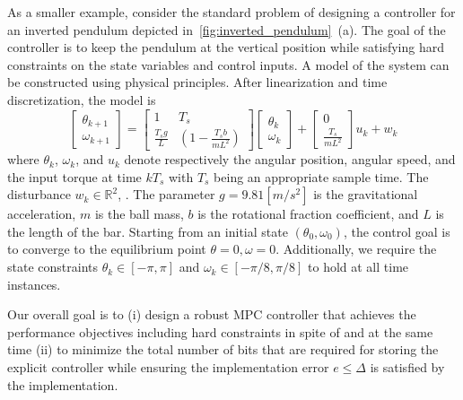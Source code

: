 As a smaller example, consider the standard problem of designing a controller for an inverted pendulum depicted in~\autoref{fig:inverted_pendulum}~{(a)}.
The goal of the controller is to keep the pendulum at the vertical position while satisfying hard constraints on the state variables and control inputs.
A model of the system can be constructed using physical principles. 
After linearization and time discretization, the model is
	\begin{equation}
		\begin{bmatrix}
			 \theta_{k+1}\\
			\omega_{k+1}
		\end{bmatrix}=
		\begin{bmatrix}
			1 & T_s\\
			\frac{T_sg}{L}& (1-\frac{T_sb}{mL^2})		
		\end{bmatrix}
		\begin{bmatrix}
			\theta_k\\
			\omega_k
		\end{bmatrix}+
		\begin{bmatrix}
			0\\
			\frac{T_s}{mL^2}
		\end{bmatrix}u_k + w_k
		\label{eq:pendul_ss}
	\end{equation}
where $\theta_k$, $\omega_k$, and $u_k$ denote respectively the angular position, angular speed, 
and the input torque at time $kT_s$ with $T_s$ being an appropriate sample time.
The disturbance $w_k\in\mathbb R^2$, . 
The parameter $g=9.81 [m/s^2]$ is the gravitational acceleration, $m$ is the ball mass, $b$ is the rotational fraction coefficient, 
and $L$ is the length of the bar. 
Starting from an initial state $(\theta_0,\omega_0)$, the control goal is to converge to the equilibrium point 
$\theta=0, \omega=0$.
Additionally, we require the state constraints $\theta_k\in[-\pi,\pi]$ and $\omega_k\in[-\pi/8,\pi/8]$ to hold at all time instances.

Our overall goal is to 
(i) design a robust MPC controller that achieves the performance objectives including hard constraints in spite of 
and at the same time
(ii) to minimize the total number of bits that are required for storing the explicit controller 
while ensuring the implementation error $e\leq \Delta$ is satisfied by the implementation.

